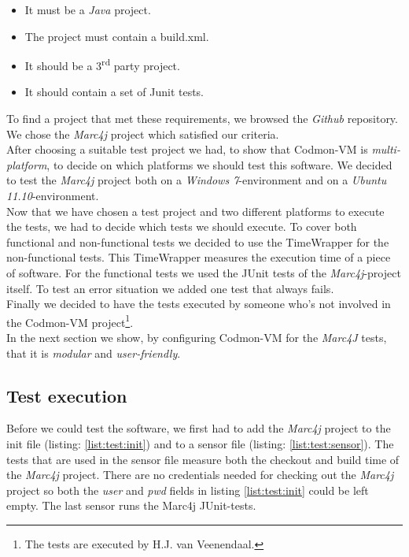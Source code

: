 \documentclass{article}
\newcommand{\project}{Codmon-VM}
\begin{document}
\begin{itemize}
\item It must be a \emph{Java} project.
\item The project must contain a build.xml.
\item It should be a 3\textsuperscript{rd} party project.
\item It should contain a set of Junit tests.
\end{itemize} 

\noindent To find a project that met these requirements, we browsed the \emph{Github}\cite{Github} repository. We chose the \emph{Marc4j}\cite{marc4j} project which satisfied our criteria.\\

\noindent After choosing a suitable test project we had, to show that \project{} is \emph{multi-platform}, to decide on which platforms we should test this software. We decided to test the \emph{Marc4j} 
project both on a \emph{Windows 7}-environment and on a \emph{Ubuntu 11.10}-environment.\\


\noindent Now that we have chosen a test project and two different platforms to execute the tests, we had to decide which tests we should execute. To cover both functional and non-functional tests we 
decided to use the TimeWrapper for the non-functional tests. This TimeWrapper measures the execution time of a piece of software. For the functional tests we used the JUnit tests of the \emph{Marc4j}-project 
itself. To test an error situation we added one test that always fails.\\

\noindent Finally we decided to have the tests executed by someone who's not involved in the \project{} project\footnote{The tests are executed by H.J. van Veenendaal.}.\\

\noindent In the next section we show, by configuring \project{} for the \emph{Marc4J} tests, that it is \emph{modular} and \emph{user-friendly}.\\

\subsection{Test execution}
\label{test:exec}
Before we could test the software, we first had to add the \emph{Marc4j} project to the init file (listing: \ref{list:test:init}) and to a sensor file (listing: \ref{list:test:sensor}). The tests that are 
used in the sensor file measure both the checkout and build time of the \emph{Marc4j} project. There are no credentials needed for checking out the \emph{Marc4j} project so both the \emph{user} and 
\emph{pwd} fields in listing \ref{list:test:init} could be left empty. The last sensor runs the Marc4j JUnit-tests.\\
\end{document}

